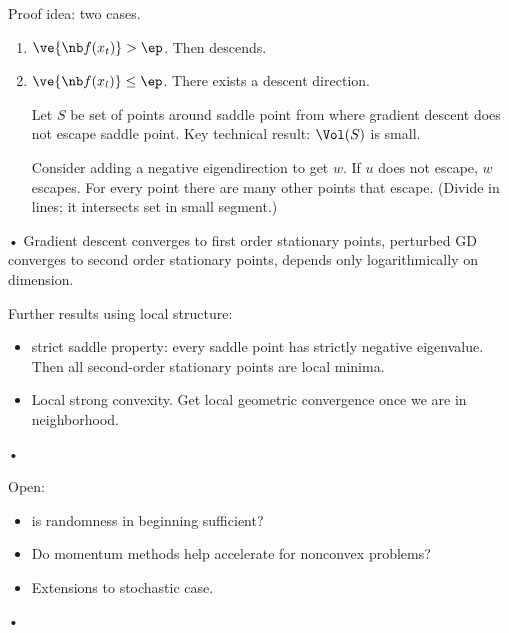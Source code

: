 Proof idea: two cases.
\begin{enumerate}
\item
$\ve{\nb f(x_t)}>\ep$. Then descends.
\item
$\ve{\nb f(x_l)}\le \ep$. There exists a descent direction.

Let $S$ be set of points around saddle point from where gradient descent does not escape saddle point. Key technical result: $\Vol(S)$ is small. 

Consider adding a negative eigendirection to get $w$. If $u$ does not escape, $w$ escapes. For every point there are many other points that escape. (Divide in lines; it intersects set in small segment.)
\end{enumerate}•
Gradient descent converges to first order stationary points, perturbed GD converges to second order stationary points, depends only logarithmically on dimension.

Further results using local structure:
\begin{itemize}
\item
strict saddle property: every saddle point has strictly negative eigenvalue. Then all second-order stationary points are local minima.
\item
Local strong convexity. Get local geometric convergence once we are in neighborhood.
\end{itemize}•

Open:
\begin{itemize}
\item
is randomness in beginning sufficient?
\item
Do momentum methods help accelerate for nonconvex problems?
\item
Extensions to stochastic case.
\end{itemize}•